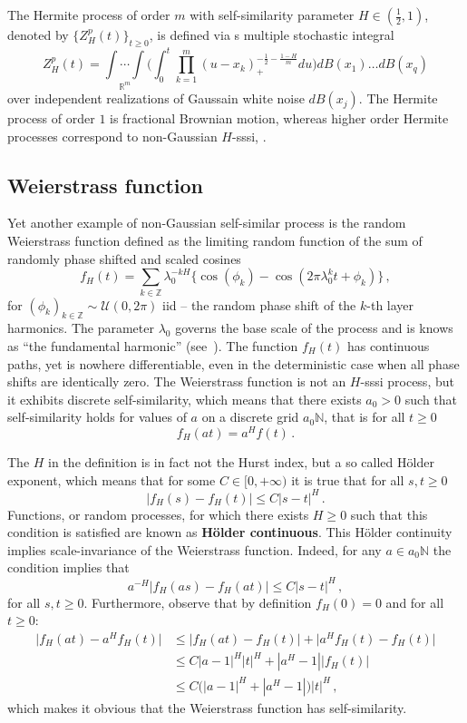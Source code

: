 \documentclass[a4paper]{article}
\newcommand{\Real}{\mathbb{R}}
\begin{document}
The Hermite process of order $m$ with self-similarity parameter $H\in(\tfrac{1}{2},1)$,
denoted by $\bigl\{Z_H^p(t)\bigr\}_{t\geq 0}$, is defined via s multiple stochastic
integral
\[
Z_H^p(t) = \underset{\Real^m}{\int \cdots \int} \Biggl(
\int^t_0 \prod_{k=1}^m (u-x_k)_+^{-\frac{1}{2}-\frac{1-H}{m}} du\Biggr) dB(x_1) \ldots dB(x_q)
\]
over independent realizations of Gaussain white noise $dB(x_j)$. The Hermite process
of order $1$ is fractional Brownian motion, whereas higher order Hermite processes
correspond to non-Gaussian $H$-sssi, \cite{Bai20141710}.


\subsection{Weierstrass function} %
\label{sub:weierstrass_function}

Yet another example of non-Gaussian self-similar process is the random Weierstrass
function defined as the limiting random function of the sum of randomly phase shifted
and scaled cosines
\[
f_H(t)
= \sum_{k\in \mathbb{Z}} \lambda_0^{-kH}\bigl\{ \cos(\phi_k)
- \cos(2\pi \lambda_0^k t + \phi_k) \bigr\} \,,
\]
for $(\phi_k)_{k\in\mathbb{Z}}\sim \mathcal{U}(0,2\pi)$ iid -- the random phase
shift of the $k$-th layer harmonics. The parameter $\lambda_0$ governs the base
scale of the process and is knows as ``the fundamental harmonic'' (see~\cite{decrouez2013estimation}).
The function $f_H(t)$ has continuous paths, yet is nowhere differentiable, even
in the deterministic case when all phase shifts are identically zero. The Weierstrass
function is not an $H$-sssi process, but it exhibits discrete self-similarity, which
means that there exists $a_0>0$ such that self-similarity holds for values of $a$
on a discrete grid $a_0\mathbb{N}$, that is for all $t\geq 0$
\[ f_H(at) = a^H f(t)\,. \]

The $H$ in the definition is in fact not the Hurst index, but a so called H\"older
exponent, which means that for some $C\in[0,+\infty)$ it is true that for all $s,t\geq0$
\[ \bigl\lvert f_H(s) - f_H(t) \bigr\rvert \leq C |s-t|^H \,. \]
Functions, or random processes, for which there exists $H\geq0$ such that this
condition is satisfied are known as \textbf{H\"older continuous}. This H\"older
continuity implies scale-invariance of the Weierstrass function. Indeed, for any
$a\in a_0\mathbb{N}$ the condition implies that
\[ a^{-H}\bigl\lvert f_H(as) - f_H(at) \bigr\rvert \leq C |s-t|^H\,, \]
for all $s,t\geq 0$. Furthermore, observe that by definition $f_H(0)=0$ and for
all $t\geq0$:
\begin{align*}
	\bigl\lvert f_H(at) - a^H f_H(t) \bigr\rvert
	&\leq \bigl\lvert f_H(at) - f_H(t) \bigr\rvert
	+ \bigl\lvert a^H f_H(t) - f_H(t) \bigr\rvert \\
	&\leq C |a - 1|^H |t|^H + |a^H - 1|\bigl\lvert f_H(t)\bigr\rvert\\
	&\leq C \bigl( |a - 1|^H  + |a^H - 1| \bigr) |t|^H \,,
\end{align*}
which makes it obvious that the Weierstrass function has self-similarity.
\end{document}
